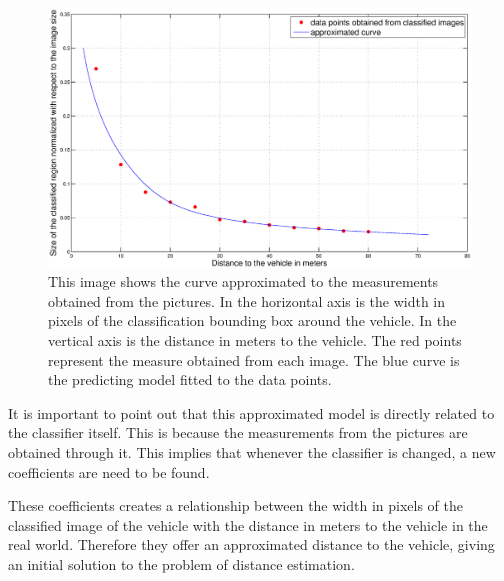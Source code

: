 \begin{figure}[h]
\centering
\includegraphics[width=\linewidth]{img/fitted_curve.eps}
\caption{This image shows the curve approximated to the measurements obtained
from the pictures. In the horizontal axis is the width in pixels of
the classification bounding box around the vehicle. In the vertical axis is the
distance in meters to the vehicle. The red points represent the measure obtained
from each image. The blue curve is the predicting model fitted to the data points.}
\label{fig:distance-curve-fitting}
\end{figure} 

It is important to point out that this approximated model is directly related to
the classifier itself. This is because the measurements from the pictures are
obtained through it. This implies that whenever the classifier is changed, a new
coefficients are need to be found.

These coefficients creates a relationship between the width in pixels
of the classified image of the vehicle with the distance in meters to the
vehicle in the real world. Therefore they offer an approximated distance to the
vehicle, giving an initial solution to the problem of distance estimation.

